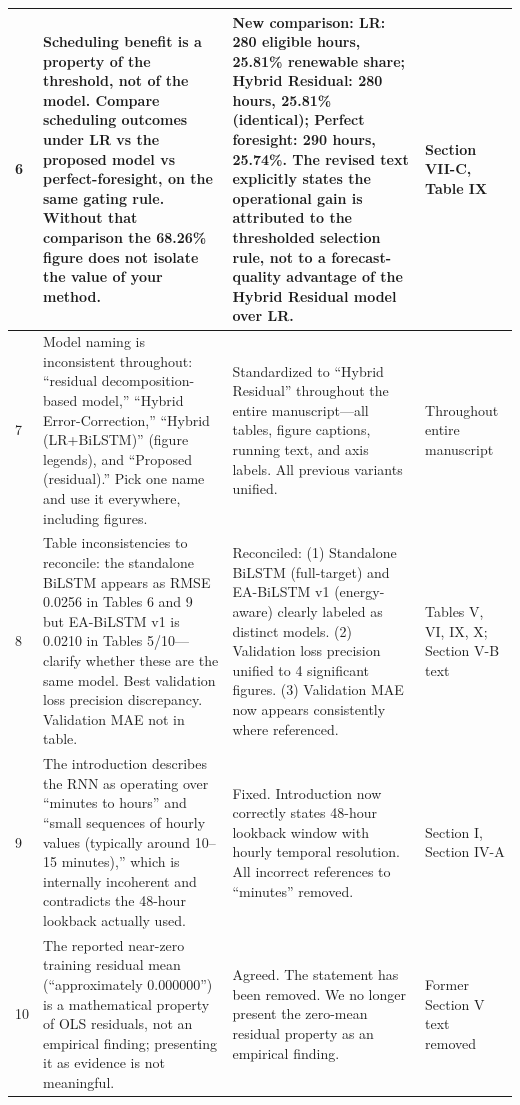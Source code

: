 \documentclass[11pt,a4paper]{article}
\begin{document}
\begin{longtable}{|p{1.5cm}|p{3.5cm}|p{6.2cm}|p{2.8cm}|}
6 & Scheduling benefit is a property of the threshold, not of the model. Compare scheduling outcomes under LR vs the proposed model vs perfect-foresight, on the same gating rule. Without that comparison the 68.26\% figure does not isolate the value of your method. & New comparison: LR: 280 eligible hours, 25.81\% renewable share; Hybrid Residual: 280 hours, 25.81\% (identical); Perfect foresight: 290 hours, 25.74\%. The revised text explicitly states the operational gain is attributed to the thresholded selection rule, not to a forecast-quality advantage of the Hybrid Residual model over LR. & Section VII-C, Table IX \\
\hline

7 & Model naming is inconsistent throughout: ``residual decomposition-based model,'' ``Hybrid Error-Correction,'' ``Hybrid (LR+BiLSTM)'' (figure legends), and ``Proposed (residual).'' Pick one name and use it everywhere, including figures. & Standardized to ``Hybrid Residual'' throughout the entire manuscript---all tables, figure captions, running text, and axis labels. All previous variants unified. & Throughout entire manuscript \\
\hline

8 & Table inconsistencies to reconcile: the standalone BiLSTM appears as RMSE 0.0256 in Tables 6 and 9 but EA-BiLSTM v1 is 0.0210 in Tables 5/10---clarify whether these are the same model. Best validation loss precision discrepancy. Validation MAE not in table. & Reconciled: (1) Standalone BiLSTM (full-target) and EA-BiLSTM v1 (energy-aware) clearly labeled as distinct models. (2) Validation loss precision unified to 4 significant figures. (3) Validation MAE now appears consistently where referenced. & Tables V, VI, IX, X; Section V-B text \\
\hline

9 & The introduction describes the RNN as operating over ``minutes to hours'' and ``small sequences of hourly values (typically around 10--15 minutes),'' which is internally incoherent and contradicts the 48-hour lookback actually used. & Fixed. Introduction now correctly states 48-hour lookback window with hourly temporal resolution. All incorrect references to ``minutes'' removed. & Section I, Section IV-A \\
\hline

10 & The reported near-zero training residual mean (``approximately 0.000000'') is a mathematical property of OLS residuals, not an empirical finding; presenting it as evidence is not meaningful. & Agreed. The statement has been removed. We no longer present the zero-mean residual property as an empirical finding. & Former Section V text removed \\
\hline


\end{longtable}
\end{document}
